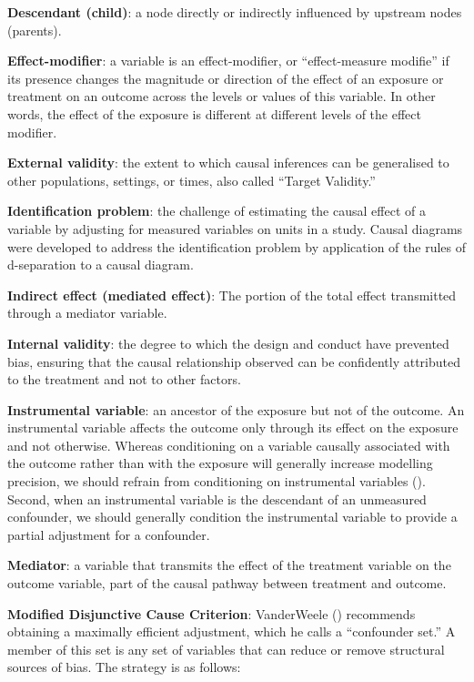 \documentclass[
  singlecolumn]{article}
\begin{document}
\textbf{Descendant (child)}: a node directly or indirectly influenced by
upstream nodes (parents).

\textbf{Effect-modifier}: a variable is an effect-modifier, or
``effect-measure modifie'' if its presence changes the magnitude or
direction of the effect of an exposure or treatment on an outcome across
the levels or values of this variable. In other words, the effect of the
exposure is different at different levels of the effect modifier.

\textbf{External validity}: the extent to which causal inferences can be
generalised to other populations, settings, or times, also called
``Target Validity.''

\textbf{Identification problem}: the challenge of estimating the causal
effect of a variable by adjusting for measured variables on units in a
study. Causal diagrams were developed to address the identification
problem by application of the rules of d-separation to a causal diagram.

\textbf{Indirect effect (mediated effect)}: The portion of the total
effect transmitted through a mediator variable.

\textbf{Internal validity}: the degree to which the design and conduct
have prevented bias, ensuring that the causal relationship observed can
be confidently attributed to the treatment and not to other factors.

\textbf{Instrumental variable}: an ancestor of the exposure but not of
the outcome. An instrumental variable affects the outcome only through
its effect on the exposure and not otherwise. Whereas conditioning on a
variable causally associated with the outcome rather than with the
exposure will generally increase modelling precision, we should refrain
from conditioning on instrumental variables
(). Second, when
an instrumental variable is the descendant of an unmeasured confounder,
we should generally condition the instrumental variable to provide a
partial adjustment for a confounder.

\textbf{Mediator}: a variable that transmits the effect of the treatment
variable on the outcome variable, part of the causal pathway between
treatment and outcome.

\textbf{Modified Disjunctive Cause Criterion}: VanderWeele
() recommends obtaining a maximally
efficient adjustment, which he calls a ``confounder set.'' A member of
this set is any set of variables that can reduce or remove structural
sources of bias. The strategy is as follows:
\end{document}
